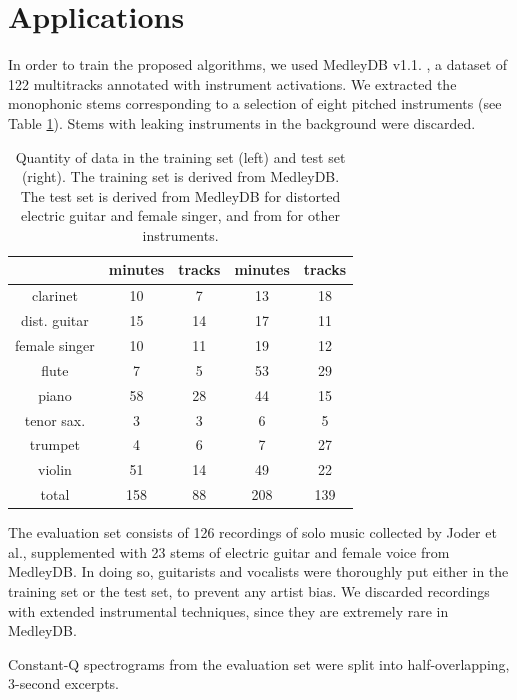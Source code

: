\documentclass{article}
\makeatletter
\newcommand*{\etal}{et al.\@\xspace}
\makeatother
\begin{document}
\section{Applications}\label{sec:single-instrument}
In order to train the proposed algorithms, we used MedleyDB v1.1. \cite{Bittner2014}, a
dataset of 122 multitracks annotated with instrument activations. 
We extracted the monophonic stems corresponding to a selection of eight pitched
instruments (see Table \ref{table:single-label-durations}).
Stems with leaking instruments in the background were discarded.

\begin{table}
	\begin{center}
	\begin{tabular}{|c|cc|cc|}
		\hline
		& minutes & tracks & minutes & tracks \\
		\hline
		clarinet & 10 & 7 & 13 & 18 \\
		dist. guitar & 15 & 14 & 17 & 11 \\
		female singer & 10 & 11 & 19 & 12 \\
		flute & 7 & 5 & 53 & 29 \\
		piano & 58 & 28 & 44 & 15 \\
		tenor sax. & 3 & 3 & 6 & 5 \\
		trumpet & 4 & 6 & 7 & 27 \\
		violin & 51 & 14 & 49 & 22 \\
		\hline
		total & 158 & 88 & 208 & 139 \\
		\hline
	\end{tabular}
	\end{center}
	\caption{
	Quantity of data in the training set (left) and test set (right).
	The training set is derived from MedleyDB.
	The test set is derived from MedleyDB for distorted electric guitar and female singer,
	and from \cite{Joder2009} for other instruments.
	\label{table:single-label-durations}}
\end{table}

The evaluation set consists of 126 recordings of solo music collected by
Joder \etal \cite{Joder2009}, supplemented with
23 stems of electric guitar and female voice from MedleyDB.
In doing so, guitarists and vocalists were thoroughly put either in the training set or the test set,
to prevent any artist bias.
We discarded recordings with extended instrumental techniques, since they are
extremely rare in MedleyDB.

Constant-Q spectrograms from the evaluation set were split into half-overlapping,
3-second excerpts.
\end{document}
